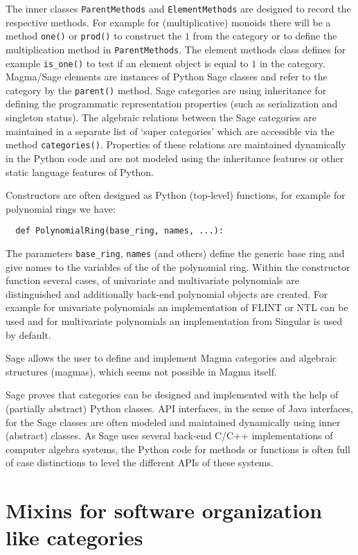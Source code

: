\documentclass{llncs}
\newcommand{\code}[1]{\texttt{#1}}
\begin{document}
The inner classes \code{ParentMethods} and \code{ElementMethods} are
designed to re\-cord the respective methods. For example for
(multiplicative) monoids there will be a method \code{one()} or
\code{prod()} to construct the $1$ from the category or to define the
multiplication method in \code{ParentMethods}. The element methods
class defines for example \code{is\_one()} to test if an element object
is equal to $1$ in the category.
%
Magma/Sage elements are instances of Python Sage classes and refer to
the category by the \code{parent()} method. Sage categories are using
inheritance for defining the programmatic representation properties
(such as serialization and singleton status).  The algebraic relations
between the Sage categories are maintained in a separate list of
`super categories' which are accessible via the method
\code{categories()}.  Properties of these relations are maintained
dynamically in the Python code and are not modeled using the
inheritance features or other static language features of Python.

Constructors are often designed as Python (top-level) functions, for
example for polynomial rings we have:
\begin{verbatim}
  def PolynomialRing(base_ring, names, ...):
\end{verbatim}
The parameters \code{base\_ring}, \code{names} (and others) define the
generic base ring and give names to the variables of the of the
polynomial ring.  Within the constructor function several cases, of
univariate and multivariate polynomials are distinguished and
additionally back-end polynomial objects are created. For example for
univariate polynomials an implementation of FLINT or NTL can be used
and for multivariate polynomials an implementation from Singular is
used by default.

Sage allows the user to define and implement Magma categories and
algebraic structures (magmas), which seems not possible in Magma itself.

Sage proves that categories can be designed and implemented with the
help of (partially abstract) Python classes. API interfaces, in the
sense of Java interfaces, for the Sage classes are often modeled and
maintained dynamically using inner (abstract) classes. As Sage uses
several back-end C/C++ implementations of computer algebra systems, the
Python code for methods or functions is often full of case distinctions
to level the different APIs of these systems.



\section{Mixins for software organization like categories} %
\label{sec:mixin}
\end{document}
